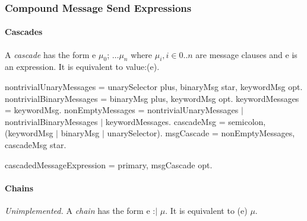 \documentclass{article}
\newcommand{\code}[1]{{\sf #1}}
\begin{document}
\subsubsection{Compound Message Send Expressions}

\paragraph{Cascades}
\label{cascade}

A {\em cascade} has the form \code{e $\mu_0$; $\ldots \mu_n$} where $\mu_i, i \in 0 .. n$ are message clauses and \code{e} is an expression. It is equivalent to \code{[:p $|$ p $\mu_0$. $\ldots$ p $\mu_n$] value:(e)}.

\begin{newspeak}
nontrivialUnaryMessages = unarySelector plus, binaryMsg star,  keywordMsg opt.
nontrivialBinaryMessages = binaryMsg plus, keywordMsg opt.
keywordMessages = keywordMsg.
nonEmptyMessages = nontrivialUnaryMessages $|$
                             nontrivialBinaryMessages  $|$
                             keywordMessages.
cascadeMsg = semicolon, (keywordMsg $|$ binaryMsg $|$ unarySelector).
msgCascade = nonEmptyMessages, cascadeMsg star.
                                                                                                                        
cascadedMessageExpression = primary, msgCascade opt.                                                                                                                    
\end{newspeak}

\paragraph{Chains}

{\it Unimplemented.} A {\em chain} has the form \code{e :$|$ $\mu$}. It is equivalent to \code{(e) $\mu$}.
\end{document}
